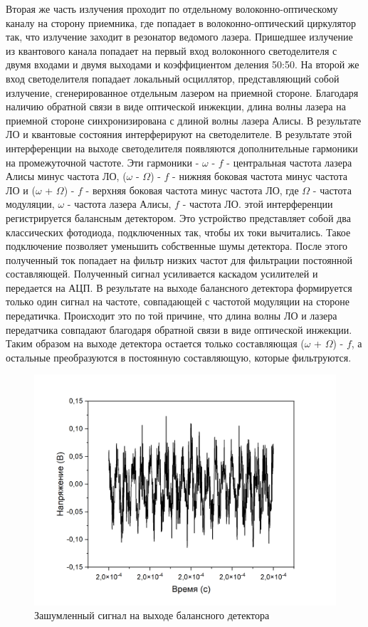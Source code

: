 Вторая же часть излучения проходит по отдельному волоконно-оптическому каналу на сторону приемника, где попадает в волоконно-оптический циркулятор так, что излучение заходит в резонатор ведомого лазера. 
Пришедшее излучение из квантового канала попадает на первый вход волоконного светоделителя с двумя входами и двумя выходами и коэффициентом деления 50:50. На второй же вход светоделителя попадает локальный осциллятор, представляющий собой излучение, сгенерированное отдельным лазером на приемной стороне. Благодаря наличию обратной связи в виде оптической инжекции, длина волны лазера на приемной стороне синхронизирована с длиной волны лазера Алисы. В результате ЛО и квантовые состояния интерферируют на светоделителе. В результате этой интерференции на выходе светоделителя появляются дополнительные гармоники на промежуточной частоте. Эти гармоники -  $\omega$ - $f$ - центральная частота лазера Алисы минус частота ЛО, ($\omega$ - $\Omega$) - $f$  - нижняя боковая частота минус частота ЛО   и ($\omega$ + $\Omega$) - $f$ - верхняя боковая частота минус частота ЛО, где $\Omega$ - частота модуляции, $\omega$ - частота лазера Алисы, $f$ - частота ЛО. 
 этой интерференции регистрируется балансным детектором. Это устройство представляет собой два классических фотодиода, подключенных так, чтобы их токи вычитались. Такое подключение позволяет уменьшить собственные шумы детектора. После этого полученный ток попадает на фильтр низких частот для фильтрации постоянной составляющей. Полученный сигнал усиливается каскадом усилителей и передается на АЦП.  В результате на выходе балансного детектора формируется только один сигнал на частоте, совпадающей с частотой модуляции на стороне передатичка. Происходит это по той причине, что длина волны ЛО и лазера передатчика совпадают благодаря обратной связи в виде оптической инжекции. Таким образом на выходе детектора остается только составляющая ($\omega$ + $\Omega$) - $f$, а остальные преобразуются в постоянную составляющую, которые фильтруются. 
\begin{figure}
    \centering
    \includegraphics[width=\textwidth]{images/03.png}
    \caption{Зашумленный сигнал на выходе балансного детектора}
    \label{fig:noisy output inject}
\end{figure}
